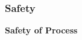 \documentclass{report}
\begin{document}


\subsubsection{Safety}
\label{sec:safety}


\textbf{Safety of Process}
\label{sec:safety-process}



\end{document}
